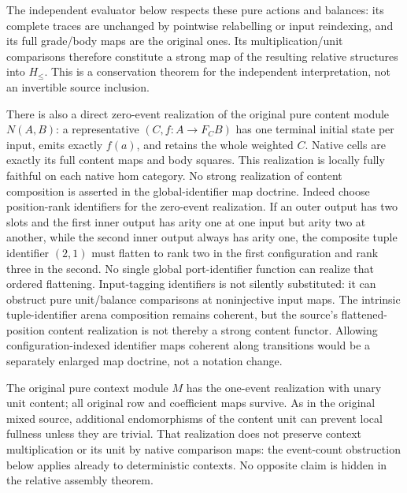 \documentclass[11pt]{article}
\begin{document}
The independent evaluator below respects these pure actions and balances: its complete traces are unchanged by pointwise relabelling or input reindexing, and its full grade/body maps are the original ones. Its multiplication/unit comparisons therefore constitute a strong map of the resulting relative structures into $H_{\leq}$. This is a conservation theorem for the independent interpretation, not an invertible source inclusion.

There is also a direct zero-event realization of the original pure content module $N(A,B)$: a representative $(C,f:A\to F_CB)$ has one terminal initial state per input, emits exactly $f(a)$, and retains the whole weighted $C$. Native cells are exactly its full content maps and body squares. This realization is locally fully faithful on each native hom category. No strong realization of content composition is asserted in the global-identifier map doctrine. Indeed choose position-rank identifiers for the zero-event realization. If an outer output has two slots and the first inner output has arity one at one input but arity two at another, while the second inner output always has arity one, the composite tuple identifier $(2,1)$ must flatten to rank two in the first configuration and rank three in the second. No single global port-identifier function can realize that ordered flattening. Input-tagging identifiers is not silently substituted: it can obstruct pure unit/balance comparisons at noninjective input maps. The intrinsic tuple-identifier arena composition remains coherent, but the source's flattened-position content realization is not thereby a strong content functor. Allowing configuration-indexed identifier maps coherent along transitions would be a separately enlarged map doctrine, not a notation change.

The original pure context module $M$ has the one-event realization with unary unit content; all original row and coefficient maps survive. As in the original mixed source, additional endomorphisms of the content unit can prevent local fullness unless they are trivial. That realization does not preserve context multiplication or its unit by native comparison maps: the event-count obstruction below applies already to deterministic contexts. No opposite claim is hidden in the relative assembly theorem.
\end{document}
